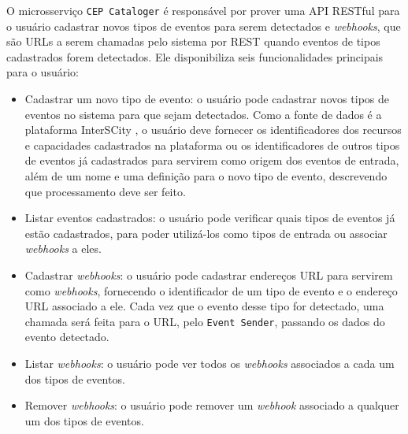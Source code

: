 O microsserviço \texttt{CEP Cataloger} é responsável por prover uma API RESTful para o usuário cadastrar novos tipos de eventos para serem detectados e \textit{webhooks}, que são URLs a serem chamadas pelo sistema por REST quando eventos de tipos cadastrados forem detectados. Ele disponibiliza seis funcionalidades principais para o usuário:
\begin{itemize}
    \item Cadastrar um novo tipo de evento: o usuário pode cadastrar novos tipos de eventos no sistema para que sejam detectados. Como a fonte de dados é a plataforma InterSCity%
    , o usuário deve fornecer os identificadores dos recursos e capacidades cadastrados na plataforma ou os identificadores de outros tipos de eventos já cadastrados para servirem como origem dos eventos de entrada, além de um nome e uma definição para o novo tipo de evento, descrevendo que processamento deve ser feito.
    \item Listar eventos cadastrados: o usuário pode verificar quais tipos de eventos já estão cadastrados, para poder utilizá-los como tipos de entrada ou associar \textit{webhooks} a eles.
    \item Cadastrar \textit{webhooks}:  o usuário pode cadastrar endereços URL para servirem como \textit{webhooks}, fornecendo o identificador de um tipo de evento e o endereço URL associado a ele. Cada vez que o evento desse tipo for detectado, uma chamada será feita para o URL, pelo \texttt{Event Sender}, passando os dados do evento detectado.
    \item Listar \textit{webhooks}: o usuário pode ver todos os \textit{webhooks} associados a cada um dos tipos de eventos.
    \item Remover \textit{webhooks}: o usuário pode remover um \textit{webhook} associado a qualquer um dos tipos de eventos.
\end{itemize}

